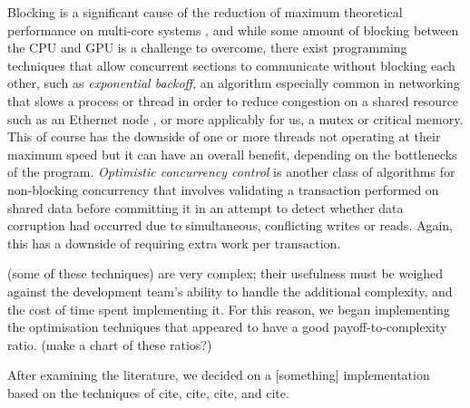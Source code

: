 \documentclass[11pt, a4paper, twocolumn]{article}
\begin{document}
Blocking is a significant cause of the reduction of maximum theoretical performance on multi-core systems \citep{Alemany1992}, and while some amount of blocking between the CPU and GPU is a challenge to overcome, there exist programming techniques that allow concurrent sections to communicate without blocking each other, such as \emph{exponential backoff}, an algorithm especially common in networking that slows a process or thread in order to reduce congestion on a shared resource such as an Ethernet node \citep{Goodman2019}, or more applicably for us, a mutex or critical memory. This of course has the downside of one or more threads not operating at their maximum speed but it can have an overall benefit, depending on the bottlenecks of the program. \emph{Optimistic concurrency control} is another class of algorithms for non-blocking concurrency that involves validating a transaction performed on shared data before committing it \cite{Herlihy1993} in an attempt to detect whether data corruption had occurred due to simultaneous, conflicting writes or reads. Again, this has a downside of requiring extra work per transaction.

(some of these techniques) are very complex; their usefulness must be weighed against the development team's ability to handle the additional complexity, and the cost of time spent implementing it. For this reason, we began implementing the optimisation techniques that appeared to have a good payoff-to-complexity ratio. (make a chart of these ratios?)



After examining the literature, we decided on a [something] implementation based on the techniques of cite, cite, cite, and cite.






\end{document}
